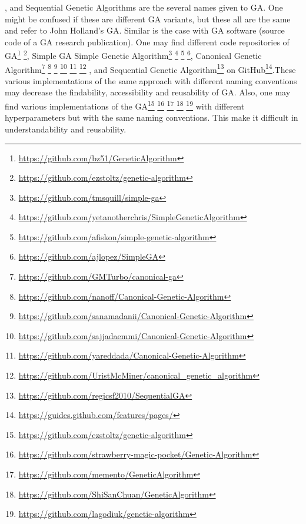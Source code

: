 \documentclass[preprint,12pt]{elsarticle}
\begin{document}
\cite{chambers2019practical}, and Sequential Genetic Algorithms \cite{mitchell1998introduction}
 are the several names given to GA. One might be confused if these are different GA variants, but these all are the same and refer to John Holland's GA. Similar is the case with GA software (source code of a GA research publication). One may find different code repositories of GA\footnote{\label{1st}\url{https://github.com/bz51/GeneticAlgorithm}} \footnote{\label{2nd}\url{ https://github.com/ezstoltz/genetic-algorithm}}, Simple GA Simple Genetic Algorithm\footnote{\label{3rd} \url{https://github.com/tmsquill/simple-ga}} \footnote{\label{4th}\url{https://github.com/yetanotherchris/SimpleGeneticAlgorithm}} 
\footnote{\label{5th}\url{https://github.com/afiskon/simple-genetic-algorithm}}
\footnote{\label{6th}\url{https://github.com/ajlopez/SimpleGA}}, Canonical Genetic Algorithm\footnote{\label{7th}\url{https://github.com/GMTurbo/canonical-ga}} \footnote{\label{8th}\url{https://github.com/nanoff/Canonical-Genetic-Algorithm}} \footnote{\label{9th}\url{https://github.com/sanamadanii/Canonical-Genetic-Algorithm}} \footnote{\label{10th}\url{https://github.com/sajjadaemmi/Canonical-Genetic-Algorithm}} \footnote{\label{11}\url{https://github.com/yareddada/Canonical-Genetic-Algorithm}}
\footnote{\label{12}\url{https://github.com/UristMcMiner/canonical_genetic_algorithm}}
, and Sequential Genetic Algorithm\footnote{\label{13}\url{https://github.com/regicsf2010/SequentialGA}}
 on GitHub\footnote{\label{14}\url{https://guides.github.com/features/pages/}}.These various implementations of the same approach with different naming conventions may decrease the findability, accessibility and reusability of GA. Also, one may find various implementations of the GA\footnote{\url{https://github.com/ezstoltz/genetic-algorithm}} \footnote{\url{https://github.com/strawberry-magic-pocket/Genetic-Algorithm}} \footnote{\url{https://github.com/memento/GeneticAlgorithm}} \footnote{\url{https://github.com/ShiSanChuan/GeneticAlgorithm}} \footnote{\url{https://github.com/lagodiuk/genetic-algorithm}} with different hyperparameters but with the same naming conventions. This make it difficult in understandability and reusability.\\
  
\end{document}
